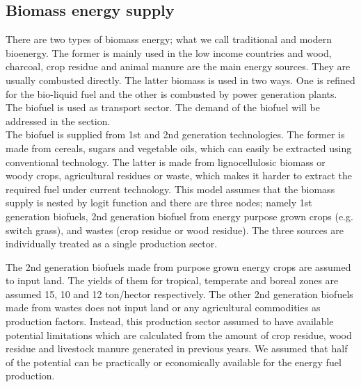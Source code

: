 \documentclass[10pt,a4paper,titlepage,dvipdfmx]{book}
\begin{document}
\begin{itemize}
\subsection{\label{subsec:BioEneSup}Biomass energy supply}

There are two types of biomass energy; what we call traditional and modern bioenergy. The former is mainly used in the low income countries and wood, charcoal, crop residue and animal manure are the main energy sources. They are usually combusted directly. The latter biomass is used in two ways. One is refined for the bio-liquid fuel and the other is combusted by power generation plants. The biofuel is used as transport sector. The demand of the biofuel will be addressed in the section. \\

The biofuel is supplied from 1st and 2nd generation technologies. The former is made from cereals, sugars and vegetable oils, which can easily be extracted using conventional technology. The latter is made from lignocellulosic biomass or woody crops, agricultural residues or waste, which makes it harder to extract the required fuel under current technology. This model assumes that the biomass supply is nested by logit function and there are three nodes; namely 1st generation biofuels, 2nd generation biofuel from energy purpose grown crops (e.g. switch grass), and wastes (crop residue or wood residue). The three sources are individually treated as a single production sector.


The 2nd generation biofuels made from purpose grown energy crops are assumed to input land. The yields of them for tropical, temperate and boreal zones are assumed 15, 10 and 12 ton/hector respectively. The other 2nd generation biofuels made from wastes does not input land or any agricultural commodities as production factors. Instead, this production sector assumed to have available potential limitations which are calculated from the amount of crop residue, wood residue and livestock manure generated in previous years. We assumed that half of the potential can be practically or economically available for the energy fuel production.



\end{itemize}
\end{document}
